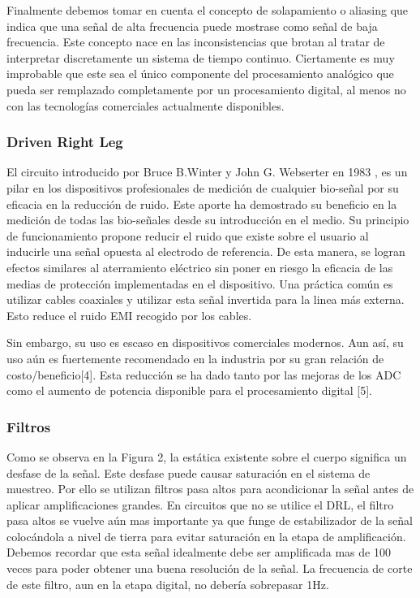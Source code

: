 Finalmente debemos tomar en cuenta el concepto de solapamiento o aliasing que indica que una señal de alta frecuencia puede mostrase como señal de baja frecuencia. Este concepto nace en las inconsistencias que brotan al tratar de interpretar discretamente un sistema de tiempo continuo. Ciertamente es muy improbable que este  sea el único componente del procesamiento analógico que pueda ser remplazado completamente por un procesamiento digital, al menos no con las tecnologías comerciales actualmente disponibles.

\subsubsection{Driven Right Leg}
\label{sec:orgecebe0c}
El circuito introducido por Bruce B.Winter y John G. Webserter en 1983 \cite{Winter1983}, es un pilar en los dispositivos profesionales de medición de cualquier bio-señal por su eficacia en la reducción de ruido. Este aporte ha demostrado su beneficio en la medición de todas las bio-señales desde su introducción en el medio. Su principio de funcionamiento propone reducir el ruido que existe sobre el usuario al inducirle una señal opuesta al electrodo de referencia. De esta manera, se logran efectos similares al aterramiento eléctrico sin poner en riesgo la eficacia de las medias de protección implementadas en el dispositivo. Una práctica común es utilizar cables coaxiales y utilizar esta señal invertida para la linea más externa. Esto reduce el ruido EMI recogido por los cables.

Sin embargo, su uso es escaso en dispositivos comerciales modernos. Aun así, su uso aún es fuertemente recomendado en la industria por su gran relación de costo/beneficio[4]. Esta reducción se ha dado tanto por las mejoras de los ADC como el aumento de potencia disponible para el procesamiento digital [5].

\subsubsection{Filtros}
\label{sec:org976ebad}
Como se observa en la Figura 2, la estática existente sobre el cuerpo significa un desfase de la señal. Este desfase puede causar saturación en el sistema de muestreo. Por ello se utilizan filtros pasa altos para acondicionar la señal antes de aplicar amplificaciones grandes. En circuitos que no se utilice el DRL, el filtro pasa altos se vuelve aún mas importante ya que funge de estabilizador de la señal colocándola a nivel de tierra para evitar saturación en la etapa de amplificación. Debemos recordar que esta señal idealmente debe ser amplificada mas de 100 veces para poder obtener una buena resolución de la señal. La frecuencia de corte de este filtro, aun en la etapa digital, no debería sobrepasar 1Hz.

